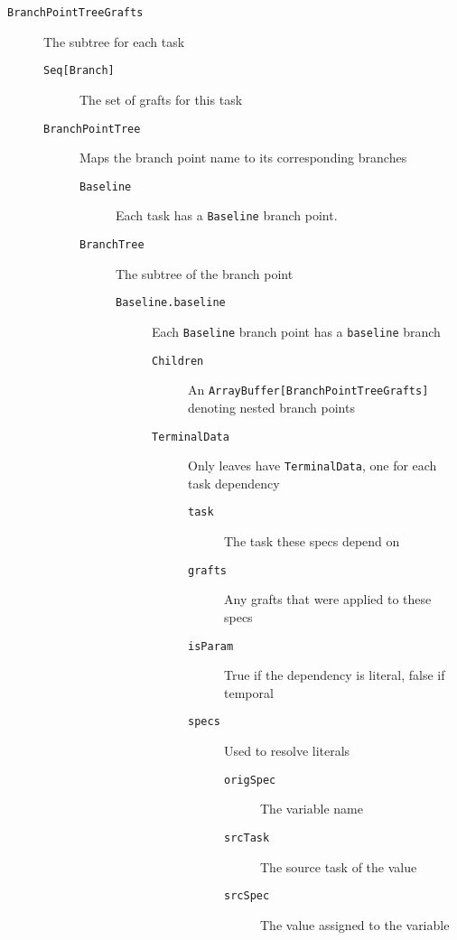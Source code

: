 \documentclass{report}
\begin{document}
\begin{description}
\item[\texttt{BranchPointTreeGrafts}] The subtree for each task
    \begin{description}
    \item[\texttt{Seq[Branch]}] The set of grafts for this task
    \item[\texttt{BranchPointTree}] Maps the branch point name to its corresponding branches
        \begin{description}
        \item[\texttt{Baseline}] Each task has a \texttt{Baseline} branch point.
        \item[\texttt{BranchTree}] The subtree of the branch point
            \begin{description}
            \item[\texttt{Baseline.baseline}] Each \texttt{Baseline} branch point has a \texttt{baseline} branch
                \begin{description}
                \item[\texttt{Children}] An \texttt{ArrayBuffer[BranchPointTreeGrafts]} denoting nested branch points
                \item[\texttt{TerminalData}] Only leaves have \texttt{TerminalData}, one for each task dependency
                    \begin{description}
                    \item[\texttt{task}] The task these specs depend on
                    \item[\texttt{grafts}] Any grafts that were applied to these specs
                    \item[\texttt{isParam}] True if the dependency is literal, false if temporal
                    \item[\texttt{specs}] Used to resolve literals
                        \begin{description}
                        \item[\texttt{origSpec}] The variable name
                        \item[\texttt{srcTask}] The source task of the value
                        \item[\texttt{srcSpec}] The value assigned to the variable
                        \end{description}
                    \end{description}
                \end{description}
            \end{description}
        \end{description}
    \end{description}
\end{description}
\end{document}
